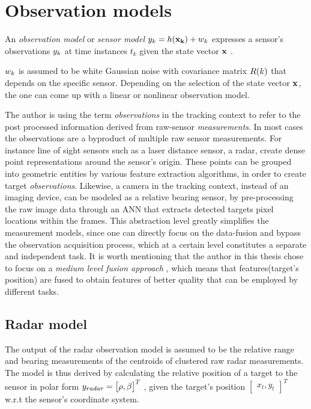 \section{Observation models} \label{sec:ObservationModels}

An \emph{observation model} or \emph{sensor model} ${{y}}_k = h(\mathbf{x_k}) + {w}_k$ expresses a sensor's observations ${{y}}_k$ at time instances $t_k$ given the state vector $\mathbf{x}$ .

 ${w}_k$ is assumed to be white Gaussian noise with covariance matrix ${R}(k)$ that depends on the specific sensor. Depending on the selection of the state vector $\mathbf{x}$, the one can come up with a linear or nonlinear observation model.

The author is using the term \emph{observations} in the tracking context to refer to the post processed information derived from raw-sensor \emph{measurements}. In most cases the observations are a byproduct of multiple raw sensor measurements. For instance line of sight sensors such as a laser distance sensor, a radar, create dense point representations around the sensor's origin. These points can be grouped into geometric entities by various feature extraction algorithms, in order to create target \emph{observations}.  Likewise, a camera in the tracking context, instead of an imaging device, can be modeled as a relative bearing sensor, by pre-processing the raw image data through an ANN that extracts detected targets pixel locations within the frames. This abstraction level greatly simplifies the measurement models, since one can directly focus on the data-fusion and bypass the observation acquisition process, which at a certain level constitutes a separate and independent task. It is worth mentioning that the author in this thesis chose to focus on a \emph{medium level fusion approach} \cite{Luo2002}, which means that features(target's position) are fused to obtain features of better quality that can be employed by different tasks.





\subsection{Radar model}

The output of the radar observation model is assumed to be the relative range and bearing measurements of the centroids of clustered raw radar measurements. The model is thus derived by calculating the relative position of a target to the sensor in polar form ${{y}}_{radar} = \begin{bmatrix}
{\rho},
{\beta}
\end{bmatrix}^{T}$ , given the target's position $\begin{bmatrix}x_t, y_t\end{bmatrix}^{T}$ w.r.t the sensor's coordinate system.

